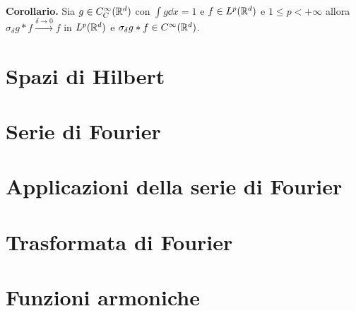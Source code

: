 \documentclass[a4paper, 12pt]{report}
\begin{document}
\textbf{Corollario.}
Sia $g \in C_C^\infty(\mathbb R^d)$ con $\int g \dd x = 1$ e $f \in L^p(\mathbb R^d)$ e $1 \leq p < +\infty$ allora $\sigma_\delta g \ast f \xrightarrow{\delta \to 0} f$ in $L^p(\mathbb R^d)$ e $\sigma_\delta g \ast f \in C^\infty(\mathbb R^d)$.














































\chapter{Spazi di Hilbert}


\chapter{Serie di Fourier}


\chapter{Applicazioni della serie di Fourier}


\chapter{Trasformata di Fourier}


\chapter{Funzioni armoniche}

\end{document}
